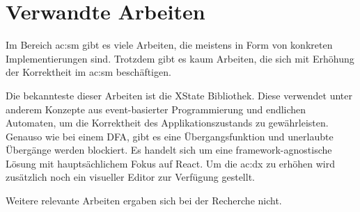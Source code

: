 \chapter{Verwandte Arbeiten}

Im Bereich \acrlong{ac:sm} gibt es viele Arbeiten, die meistens in Form von konkreten Implementierungen sind. Trotzdem gibt es kaum Arbeiten, die sich mit Erhöhung der Korrektheit im \acrshort{ac:sm} beschäftigen.

Die bekannteste dieser Arbeiten ist die XState Bibliothek. Diese verwendet unter anderem Konzepte aus event-basierter Programmierung und endlichen Automaten, um die Korrektheit des Applikationszustands zu gewährleisten. Genauso wie bei einem DFA, gibt es eine Übergangsfunktion und unerlaubte Übergänge werden blockiert. Es handelt sich um eine framework-agnostische Lösung mit hauptsächlichem Fokus auf React. Um die \acrlong{ac:dx} zu erhöhen wird zusätzlich noch ein visueller Editor zur Verfügung gestellt.\cite{xstate}

Weitere relevante Arbeiten ergaben sich bei der Recherche nicht.